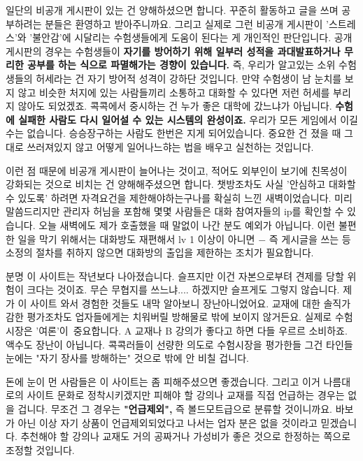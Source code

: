 일단의 비공개 게시판이 있는 건 양해하셨으면 합니다. 꾸준히 활동하고 글을 쓰며 공부하려는 분들은 환영하고 받아주니까요.
그리고 실제로 그런 비공개 게시판이 '스트레스'와 '불안감'에 시달리는 수험생들에게 도움이 된다는 게 개인적인 판단입니다.
공개 게시판의 경우는 수험생들이 \textbf{자기를 방어하기 위해 일부러 성적을 과대발표하거나 무리한 공부를 하는 식으로 파멸해가는 경향이 있습니다.}
즉, 우리가 알고있는 소위 수험생들의 허세라는 건 자기 방어적 성격이 강하단 것입니다.
만약 수험생이 남 눈치를 보지 않고 비슷한 처지에 있는 사람들끼리 소통하고 대화할 수 있다면 저런 허세를 부리지 않아도 되었겠죠.
콕콕에서 중시하는 건 누가 좋은 대학에 갔느냐가 아닙니다.
\textbf{수험에 실패한 사람도 다시 일어설 수 있는 시스템의 완성이죠.}
우리가 모든 게임에서 이길 수는 없습니다. 승승장구하는 사람도 한번은 지게 되어있습니다.
중요한 건 졌을 때 그대로 쓰러져있지 않고 어떻게 일어나느햐는 법을 배우고 실천하는 것입니다.
\vspace{5mm}

이런 점 때문에 비공개 게시판이 늘어나는 것이고, 적어도 외부인이 보기에 친목성이 강화되는 것으로 비치는 건 양해해주셨으면 합니다.
챗방조차도 사실 '안심하고 대화할 수 있도록' 하려면 자격요건을 제한해야하는구나를 확실히 느낀 새벽이었습니다.
미리 말씀드리지만 관리자 허님을 포함해 몇몇 사람들은 대화 참여자들의 ip를 확인할 수 있습니다.
오늘 새벽에도 제가 호출했을 때 말없이 나간 분도 예외가 아닙니다.
이런 불편한 일을 막기 위해서는 대화방도 재편해서 lv 1 이상이 아니면 $-$ 즉 게시글을 쓰는 등 소정의 절차를 취하지 않으면
대화방의 출입을 제한하는 조치가 필요합니다.
\vspace{5mm}

분명 이 사이트는 작년보다 나아졌습니다.
슬프지만 이건 자본으로부텨 견제를 당할 위험이 크다는 것이죠.
무슨 무협지를 쓰느냐.... 하겠지만 슬프게도 그렇지 않습니다. 제가 이 사이트 와서 경험한 것들도 내막 알아보니 장난아니었어요.
교재에 대한 솔직가감한 평가조차도 업자들에게는 치워버릴 방해물로 밖에 보이지 않거든요.
실제로 수험시장은 '여론'이 중요합니다. A 교재나 B 강의가 좋다고 하면 다들 우르르 소비하죠. 액수도 장난이 아닙니다.
콕콕러들이 선량한 의도로 수험시장을 평가한들 그건 타인들 눈에는 "자기 장사를 방해하는" 것으로 밖에 안 비칠 겁니다.
\vspace{5mm}

돈에 눈이 먼 사람들은 이 사이트는 좀 피해주셨으면 좋겠습니다.
그리고 이거 나름대로의 사이트 문화로 정착시키겠지만
피해야 할 강의나 교재를 직접 언급하는 경우는 없을 겁니다. 무조건 그 경우는 \textbf{"언급제외",} 즉 볼드모트급으로 분류할 것이니까요.
바보가 아닌 이상 자기 상품이 언급제외되었다고 나서는 업자 분은 없을 것이라고 믿겠습니다.
추천해야 할 강의나 교재도 거의 공짜거나 가성비가 좋은 것으로 한정하는 쪽으로 조정할 것입니다.
\vspace{5mm}

